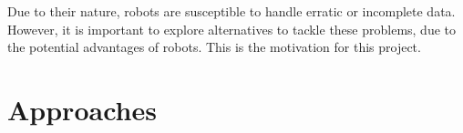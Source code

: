 Due to their nature, robots are susceptible to handle erratic or incomplete data. However, it is important to explore alternatives to tackle these problems, due to the potential advantages of robots. This is the motivation for this project.

% 

\section{Approaches}
% 



